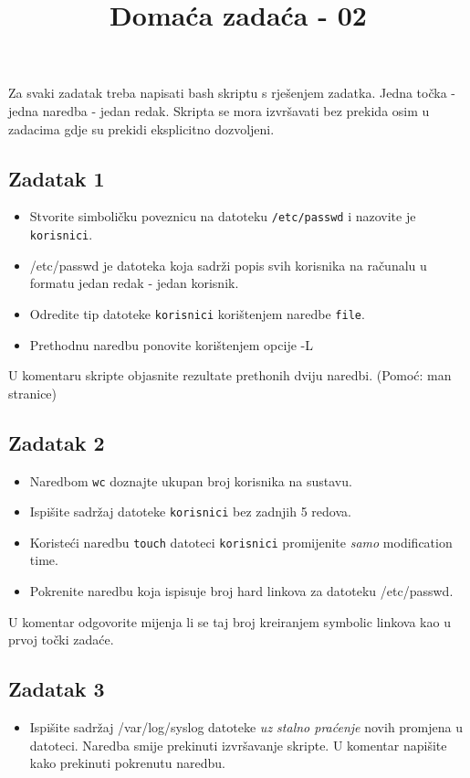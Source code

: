\documentclass[12pt,a4paper]{article}
\newcommand{\shell}[1]{\texttt{#1}}
\begin{document}
	\title{Domaća zadaća - 02\vspace{-2em}}
	\maketitle
	Za svaki zadatak treba napisati bash skriptu s rješenjem zadatka. Jedna točka - jedna naredba - jedan redak. Skripta se mora izvršavati bez prekida osim u zadacima gdje su prekidi eksplicitno dozvoljeni.
	\subsection*{Zadatak 1}
	\begin{itemize}
		\item Stvorite simboličku poveznicu na datoteku \shell{/etc/passwd} i nazovite je \shell{korisnici}.
		\item[] /etc/passwd je datoteka koja sadrži popis svih korisnika na računalu u formatu jedan redak - jedan korisnik.
		\item Odredite tip datoteke \shell{korisnici} korištenjem naredbe \shell{file}.
		\item Prethodnu naredbu ponovite korištenjem opcije -L
	\end{itemize}
	U komentaru skripte objasnite rezultate prethonih dviju naredbi. (Pomoć: man stranice)
	\subsection*{Zadatak 2}
	\begin{itemize}
		\item Naredbom \shell{wc} doznajte ukupan broj korisnika na sustavu.
		\item Ispišite sadržaj datoteke \shell{korisnici} bez zadnjih 5 redova.
		\item Koristeći naredbu \shell{touch} datoteci \shell{korisnici} promijenite \emph{samo} modification time.
		\item Pokrenite naredbu koja ispisuje broj hard linkova za datoteku /etc/passwd.
	\end{itemize}
	U komentar odgovorite mijenja li se taj broj kreiranjem symbolic linkova kao u prvoj točki zadaće.
	\subsection*{Zadatak 3}
	\begin{itemize}
		\item Ispišite sadržaj /var/log/syslog datoteke \emph{uz stalno praćenje} novih promjena u datoteci. Naredba smije prekinuti izvršavanje skripte. U komentar napišite kako prekinuti pokrenutu naredbu.
	\end{itemize}
\end{document}
